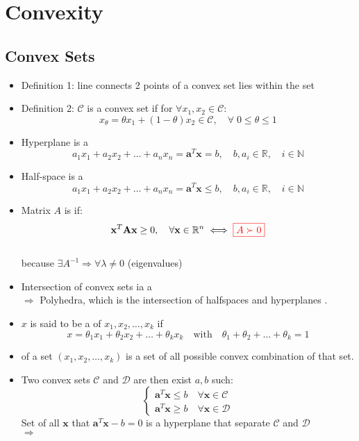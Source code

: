 \chapter{Convexity}

\section{Convex Sets}
\begin{itemize}
	\item Definition 1: line connects 2 points of a convex set lies within the set
	\item Definition 2: $\mathcal{C}$ is a convex set if for $\forall x_1, x_2 \in \mathcal{C}$:
	\[ x_\theta = \theta x_1 + (1-\theta) x_2 \in \mathcal{C}, \quad \forall\; 0 \leq \theta \leq 1\]
	\item Hyperplane is a 
	\[ a_1x_1 + a_2x_2 + \dots + a_nx_n = \textbf{a}^T\textbf{x} = b, \quad b, a_i \in \mathbb{R}, \quad i \in \mathbb{N} \]
	\item Half-space is a 
	\[ a_1x_1 + a_2x_2 + \dots + a_nx_n = \textbf{a}^T\textbf{x} \leq b, \quad b, a_i \in \mathbb{R}, \quad i \in \mathbb{N} \]
	\item Matrix $A$ is  if:
	\[ \textbf{x}^T \textbf{A} \textbf{x} \geq 0, \quad \forall \textbf{x} \in \mathbb{R}^n \iff {\color{red} \boxed{A \succ 0}}\]\\
	because $\exists A^{-1} \Rightarrow \forall \lambda \neq 0$ (eigenvalues)
	\item Intersection of convex sets ia a \\
	$\Rightarrow$ Polyhedra, which is the intersection of halfspaces and hyperplanes .
	\item $x$ is said to be a  of $x_1, x_2, \dots, x_k$ if
	\[ x = \theta_1 x_1 + \theta_2 x_2 + \dots + \theta_k x_k \quad \text{with} \quad \theta_1 + \theta_2 + \dots + \theta_k = 1 \]
	\item {} of a set $(x_1, x_2, \dots, x_k)$ is a set of all possible convex combination of that set.\\
	\item Two convex sets $\mathcal{C}$ and $\mathcal{D}$ are  then exist $a, b$ such:
	\[\begin{cases}
		\textbf{a}^T \textbf{x} \leq b \quad \forall \textbf{x} \in \mathcal{C} \\
		\textbf{a}^T \textbf{x} \geq b \quad \forall \textbf{x} \in \mathcal{D}
	\end{cases}\]
	Set of all $\textbf{x}$ that $\textbf{a}^T \textbf{x} -b = 0$ is a hyperplane that separate $\mathcal{C}$ and $\mathcal{D}$\\ $\Rightarrow$ 
\end{itemize}

